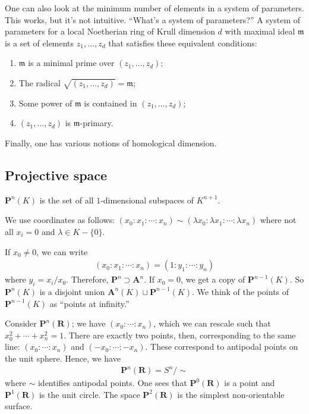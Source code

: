 \documentclass[11pt, oneside,margin=1in]{article}
\begin{document}
One can also look at the minimum number of elements in a system of parameters. This works, but it's not intuitive. ``What's a system of parameters?'' A system of parameters for a local Noetherian ring of Krull dimension $d$ with maximal ideal $\mathfrak{m}$ is a set of elements $z_1,\hdots, z_d$ that satisfies these equivalent conditions:
\begin{enumerate}
	\item $\mathfrak{m}$ is a minimal prime over $(z_1,\hdots, z_d)$;
	\item The radical $\sqrt{(z_1,\hdots, z_d)}=\mathfrak{m} $;
	\item Some power of $\mathfrak{m}$ is contained in $(z_1,\hdots, z_d)$;
	\item $(z_1,\hdots, z_d)$ is $\mathfrak{m}$-primary.
\end{enumerate}

Finally, one has various notions of homological dimension.

\subsection{Projective space}

\begin{definition}[ ]\label{}\text{}
 $\mathbf{P}^n(K)$ is the set of all $1$-dimensional subspaces of $K^{n+1}$.
\end{definition}

We use coordinates as follows: $(x_0:x_1:\cdots : x_n)\sim (\lambda x_0:\lambda x_1:\cdots:\lambda x_n)$ where not all $x_i=0$ and $\lambda\in K - \{0\}$.

If $x_0\ne 0$, we can write
\begin{align*}
	(x_0:x_1:\cdots:x_n) = (1:y_1:\cdots : y_n)
\end{align*}
where $y_i = x_i/x_0$. Therefore, $\mathbf{P}^n \supset \mathbf{A}^n$. If $x_0=0$, we get a copy of $\mathbf{P}^{n-1}(K)$. So $\mathbf{P}^n(K)$ is a disjoint union $\mathbf{A}^n(K) \sqcup \mathbf{P}^{n-1}(K) $. We think of the points of $\mathbf{P}^{n-1}(K)$ as ``points at infinity.''

Consider $\mathbf{P}^n(\mathbf{R})$; we have $(x_0:\cdots:x_n)$, which we can rescale such that $x_0^2 +\cdots+x_n^2 = 1$. There are exactly two points, then, corresponding to the same line: $(x_0:\cdots:x_n)$ and $(-x_0:\cdots:-x_n)$. These correspond to antipodal points on the unit sphere. Hence, we have
\begin{align*}
	\mathbf{P}^n(\mathbf{R}) = S^n / \sim
\end{align*}
where $\sim$ identifies antipodal points. One sees that $\mathbf{P}^0(\mathbf{R})$ is a point and $\mathbf{P}^1(\mathbf{R})$ is the unit circle. The space $\mathbf{P}^2(\mathbf{R})$ is the simplest non-orientable surface.
\end{document}
